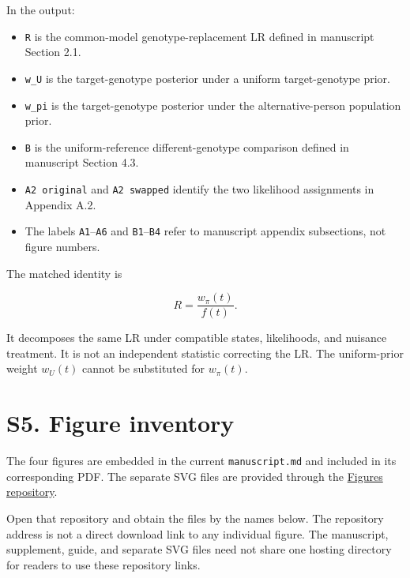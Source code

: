 \documentclass[
]{article}
\providecommand{\tightlist}{%
  \setlength{\itemsep}{0pt}\setlength{\parskip}{0pt}}
\begin{document}
In the output:

\begin{itemize}
\tightlist
\item
  \texttt{R} is the common-model genotype-replacement LR defined in
  manuscript Section 2.1.
\item
  \texttt{w\_U} is the target-genotype posterior under a uniform
  target-genotype prior.
\item
  \texttt{w\_pi} is the target-genotype posterior under the
  alternative-person population prior.
\item
  \texttt{B} is the uniform-reference different-genotype comparison
  defined in manuscript Section 4.3.
\item
  \texttt{A2\ original} and \texttt{A2\ swapped} identify the two
  likelihood assignments in Appendix A.2.
\item
  The labels \texttt{A1}--\texttt{A6} and \texttt{B1}--\texttt{B4} refer
  to manuscript appendix subsections, not figure numbers.
\end{itemize}

The matched identity is

\[
R=\frac{w_\pi(t)}{f(t)}.
\]

It decomposes the same LR under compatible states, likelihoods, and
nuisance treatment. It is not an independent statistic correcting the
LR. The uniform-prior weight \(w_U(t)\) cannot be substituted for
\(w_\pi(t)\).

\section{S5. Figure inventory}\label{s5.-figure-inventory}

The four figures are embedded in the current \texttt{manuscript.md} and
included in its corresponding PDF. The separate SVG files are provided
through the
\href{https://github.com/mmiller-ForensicDNAexperts/Figures}{Figures
repository}.

Open that repository and obtain the files by the names below. The
repository address is not a direct download link to any individual
figure. The manuscript, supplement, guide, and separate SVG files need
not share one hosting directory for readers to use these repository
links.
\end{document}
